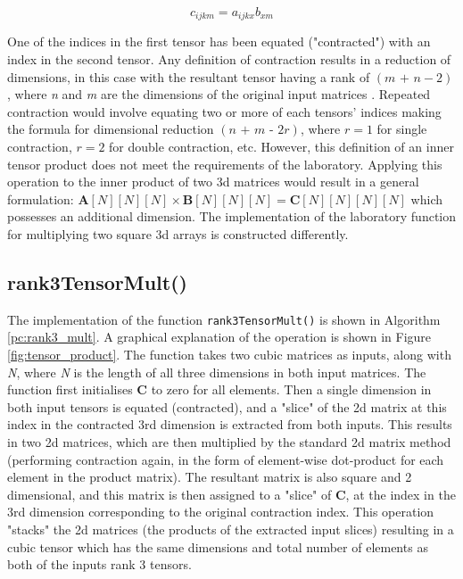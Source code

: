 \documentclass[10 pt, conference]{cssconf}
\begin{document}
\begin{equation}\label{eq:tensor_contraction_single}
    c_{ijkm} \mathrel{{=}} a_{ijkx}b_{xm}
\end{equation}%

One of the indices in the first tensor has been equated ("contracted") with an index in the second tensor. Any definition of contraction results in a reduction of dimensions, in this case with the resultant tensor having a rank of $(\textit{m + n}-2)$, where \textit{n} and \textit{m} are the dimensions of the original input matrices \cite{sochi2016introduction}.  Repeated contraction would involve equating two or more of each tensors' indices making the formula for dimensional reduction $(\textit{n + m - 2r})$, where $r=1$ for single contraction, $r=2$ for double contraction, etc. However, this definition of an inner tensor product does not meet the requirements of the laboratory. Applying this operation to the inner product of two 3d matrices would result in a general formulation: $\mathbf{A}[N][N][N] \times \mathbf{B}[N][N][N] \mathrel{=} \mathbf{C}[N][N][N][N]$ which possesses an additional dimension. The implementation of the laboratory function for multiplying two square 3d arrays is constructed differently.

\subsection{rank3TensorMult()}
The implementation of the function \verb|rank3TensorMult()| is shown in Algorithm \ref{pc:rank3_mult}. A graphical explanation of the operation is shown in Figure \ref{fig:tensor_product}. The function takes two cubic matrices as inputs, along with \textit{N}, where \textit{N} is the length of all three dimensions in both input matrices. The function first initialises $\mathbf{C}$ to zero for all elements. Then a single dimension in both input tensors is equated (contracted), and a "slice" of the 2d matrix at this index in the contracted 3rd dimension is extracted from both inputs. This results in two 2d matrices, which are then multiplied by the standard 2d matrix method (performing contraction again, in the form of element-wise dot-product for each element in the product matrix). The resultant matrix is also square and 2 dimensional, and this matrix is then assigned to a "slice" of $\mathbf{C}$, at the index in the 3rd dimension corresponding to the original contraction index. This operation "stacks" the 2d matrices (the products of the extracted input slices) resulting in a cubic tensor which has the same dimensions and total number of elements as both of the inputs rank 3 tensors.
\end{document}
